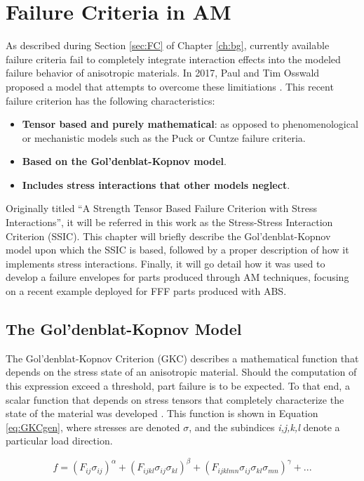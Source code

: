 \documentclass[main.tex]{subfiles}
\begin{document}
\chapter{Failure Criteria in AM} \label{ch:oocrit}

As described during Section \ref{sec:FC} of Chapter \ref{ch:bg}, currently available failure criteria fail to completely integrate interaction effects into the modeled failure behavior of anisotropic materials. In 2017, Paul and Tim Osswald proposed a model that attempts to overcome these limitiations \cite{Osswald2017a}. This recent failure criterion has the following characteristics:
\begin{itemize}
	\item \textbf{Tensor based and purely mathematical}: as opposed to phenomenological or mechanistic models such as the Puck or Cuntze failure criteria.
	\item \textbf{Based on the Gol'denblat-Kopnov model}.
	\item \textbf{Includes stress interactions that other models neglect}.
\end{itemize}

Originally titled \textquotedblleft A Strength Tensor Based Failure Criterion with Stress Interactions\textquotedblright, it will be referred in this work as the Stress-Stress Interaction Criterion (SSIC). This chapter will briefly describe the Gol'denblat-Kopnov model upon which the SSIC is based, followed by a proper description of how it implements stress interactions. Finally, it will go detail how it was used to develop a failure envelopes for parts produced through AM techniques, focusing on a recent example deployed for FFF parts produced with ABS.

\section{The Gol'denblat-Kopnov Model}\label{sec:GKC}
The Gol'denblat-Kopnov Criterion (GKC) describes a mathematical function that depends on the stress state of an anisotropic material. Should the computation of this expression exceed a threshold, part failure is to be expected. To that end, a scalar function that depends on stress tensors that completely characterize the state of the material was developed \cite{Goldenblat1965}. This function is shown in Equation \ref{eq:GKCgen}, where stresses are denoted $\sigma$, and the subindices \emph{i,j,k,l} denote a particular load direction.

\begin{equation} \label{eq:GKCgen}
f=(F_{ij}\sigma_{ij})^\alpha + (F_{ijkl}\sigma_{ij}\sigma_{kl})^\beta + (F_{ijklmn}\sigma_{ij}\sigma_{kl}\sigma_{mn})^\gamma + ...
\end{equation}
\end{document}
